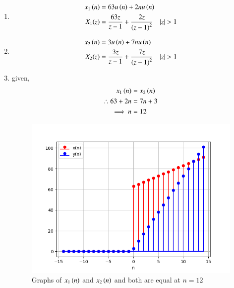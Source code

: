 \documentclass[journal,12pt,twocolumn]{IEEEtran}
\theoremstyle{remark}
\begin{document}
\begin{enumerate}
\item
\begin{align}
x_1\brak{n} &= 63u\brak{n} + 2nu\brak{n} \label{eq:3}\\
X_1(z) &= \frac{63z}{z-1} + \frac{2z}{\brak{z-1}^{2}}  \quad |z|>1
\end{align}
\item
\begin{align}
x_2\brak{n} &= 3u\brak{n} + 7nu\brak{n} \label{eq:4}\\ 
X_2(z) &= \frac{3z}{z-1} + \frac{7z}{\brak{z-1}^{2}} \quad |z|>1
\end{align}
\item

given,
\begin{align}
 x_1\left(n\right) &= x_2\left(n\right)\\
\therefore 63 + 2n &= 7n+3\\
\implies n &= 12
\end{align}\begin{figure}[ht]
    \includegraphics[width = \linewidth]{Figure_1.png}
    \caption{Graphs of $ x_1\left(n\right)$ and $ x_2\left(n\right)$ and both are equal at $ n=12$}
    \label{fig: 1}
\end{figure}
\end{enumerate}
\end{document}
